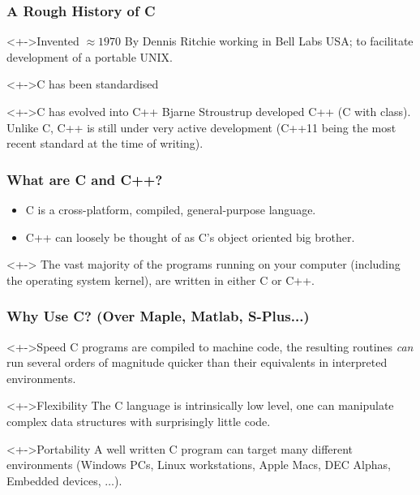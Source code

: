 \documentclass[table]{beamer}
\begin{document}
\begin{frame}
\frametitle{A Rough History of C}
\begin{block}<+->{Invented $\approx1970$}
By Dennis Ritchie working in Bell Labs USA; to facilitate development of
a portable UNIX.
\end{block}
\begin{block}<+->{C has been standardised}
\end{block}
\begin{block}<+->{C has evolved into C++}
Bjarne Stroustrup developed C++ (C with class). Unlike C, C++ is still under
very active development (C++11 being the most recent standard at the time of
writing).
\end{block}
\end{frame}

\begin{frame}
\frametitle{What are C and C++?}
\begin{itemize}
\item C is a cross-platform, compiled, general-purpose language.
\item C++ can loosely be thought of as C's object oriented big brother.
\end{itemize}
\begin{alertblock}<+->{}
The vast majority of the programs running on your computer (including the operating system kernel), are written in either C or C++.
\end{alertblock}
\end{frame}


\begin{frame}
\frametitle{Why Use C? (Over Maple, Matlab, S-Plus...)}
\begin{block}<+->{Speed}
C programs are compiled to machine code, the resulting routines \emph{can} run several orders of magnitude quicker than their equivalents in interpreted environments.
\end{block}

\begin{block}<+->{Flexibility}
The C language is intrinsically low level, one can manipulate complex data structures with surprisingly little code.
\end{block}

\begin{block}<+->{Portability}
A well written C program can target many different environments (Windows PCs, Linux workstations, Apple Macs, DEC Alphas, Embedded devices, $\ldots$).
\end{block}
\end{frame}
\end{document}

